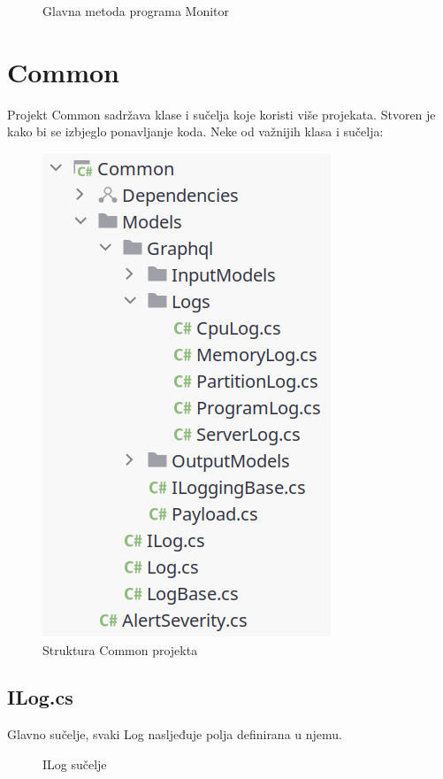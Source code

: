\documentclass[zavrsnirad]{fer}
\begin{document}
\begin{figure}[htb]
	\centering
	
	\caption{Glavna metoda programa Monitor}
\end{figure}
\FloatBarrier

\chapter{Common}
Projekt Common sadržava klase i sučelja koje koristi više projekata. Stvoren je kako bi se izbjeglo ponavljanje koda. Neke od važnijih klasa i sučelja:
\begin{figure}[htb!]
	\centering
	\includegraphics[width=0.4\linewidth]{images/common_structure.png} 
	\caption{Struktura Common projekta}
	\label{slk:common_structure.png}
\end{figure}
\FloatBarrier

\section{ILog.cs}
Glavno sučelje, svaki Log nasljeđuje polja definirana u njemu.
\begin{figure}[htb]
	\centering
	
	\caption{ILog sučelje}
\end{figure}
\FloatBarrier
\end{document}
